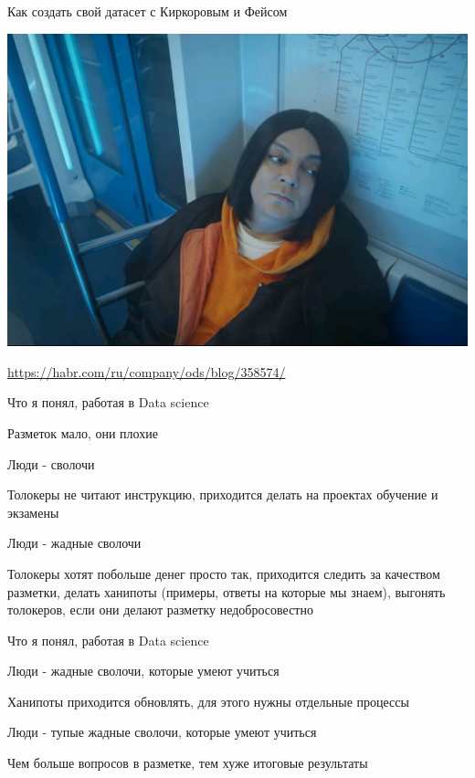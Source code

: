 \documentclass[notes,12pt, aspectratio=169]{beamer}
\newenvironment{wideitemize}{\itemize\addtolength{\itemsep}{10pt}}{\enditemize}
\begin{document}
\begin{frame}{Как создать свой датасет с Киркоровым и Фейсом}
\begin{center}
	\includegraphics[width=.6\linewidth]{kirk.jpeg}
\end{center}

\vfill 

{\color{blue} \url{https://habr.com/ru/company/ods/blog/358574/} }
\end{frame}



\begin{frame}{Что я понял, работая в Data science}
\begin{wideitemize}
	\item Разметок мало, они плохие \pause 
	
	\item Люди - сволочи \pause 
	
	\item Толокеры не читают инструкцию, приходится делать на проектах обучение и экзамены \pause 
	
	\item  Люди - жадные сволочи \pause 
	
	\item Толокеры хотят побольше денег просто так, приходится следить за качеством разметки, делать ханипоты (примеры, ответы на которые мы знаем), выгонять толокеров, если они делают разметку недобросовестно  \pause 
\end{wideitemize}
\end{frame}
	
\begin{frame}{Что я понял, работая в Data science}
\begin{wideitemize}
	\item Люди - жадные сволочи, которые умеют учиться \pause 
	
	\item Ханипоты приходится обновлять, для этого нужны отдельные процессы \pause 
	
	\item  Люди - тупые жадные сволочи, которые умеют учиться \pause 
	
	\item Чем больше вопросов в разметке, тем хуже итоговые результаты

\end{wideitemize}
\end{frame}
\end{document}

